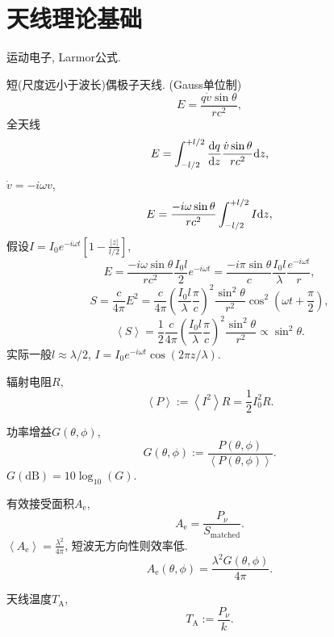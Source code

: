 \chapter{天线理论基础}

运动电子, Larmor公式.

短(尺度远小于波长)偶极子天线. (Gauss单位制)
\begin{equation}
    E=\frac{q\dot{v}\sin\theta}{rc^2},
\end{equation}
全天线
\begin{equation}
    E=\int_{-l/2}^{+l/2}\frac{\mathrm{d} q}{\mathrm{d} z}\frac{\dot{v}\sin\theta}{rc^2}\mathrm{d} z,
\end{equation}
$\dot{v}=-i\omega v$,
\begin{equation}
    E=\frac{-i\omega\sin\theta}{rc^2}\int_{-l/2}^{+l/2}I\mathrm{d} z,
\end{equation}
假设$I=I_0e^{-i\omega t}\left[1-\frac{\left\lvert z\right\rvert }{l/2}\right]$,
\begin{equation}
    E=\frac{-i\omega\sin\theta}{rc^2}\frac{I_0l}{2}e^{-i\omega t}=\frac{-i\pi\sin\theta}{c}\frac{I_0l}{\lambda}\frac{e^{-i\omega t}}{r},
\end{equation}
\begin{equation}
    S=\frac{c}{4\pi}E^2=\frac{c}{4\pi}\left(\frac{I_0l}{\lambda}\frac{\pi}{c}\right)^2\frac{\sin^2\theta}{r^2}\cos^2(\omega t+\frac{\pi}{2}),
\end{equation}
\begin{equation}
    \left\langle S\right\rangle=\frac{1}{2}\frac{c}{4\pi}\left(\frac{I_0l}{\lambda}\frac{\pi}{c}\right)^2\frac{\sin^2\theta}{r^2}\propto\sin^2\theta.
\end{equation}
实际一般$l\approx\lambda/2$, $I=I_0e^{-i\omega t}\cos(2\pi z/\lambda)$.

辐射电阻$R$,
\begin{equation}
    \left\langle P\right\rangle := \left\langle I^2\right\rangle R=\frac{1}{2}I_0^2R.
\end{equation}

功率增益$G(\theta, \phi)$,
\begin{equation}
    G(\theta, \phi):=\frac{P(\theta, \phi)}{\left\langle P(\theta, \phi)\right\rangle }.
\end{equation}
$G(\text{dB})=10\log_{10}(G)$.

有效接受面积$A_\text{e}$,
\begin{equation}
    A_\text{e}=\frac{P_\nu}{S_\text{matched}}.
\end{equation}
$\left\langle A_\text{e}\right\rangle =\frac{\lambda^2}{4\pi}$, 短波无方向性则效率低.
\begin{equation}
    A_\text{e}(\theta, \phi)=\frac{\lambda^2G(\theta, \phi)}{4\pi}.
\end{equation}

天线温度$T_\text{A}$,
\begin{equation}
    T_\text{A}:=\frac{P_\nu}{k}.
\end{equation}
